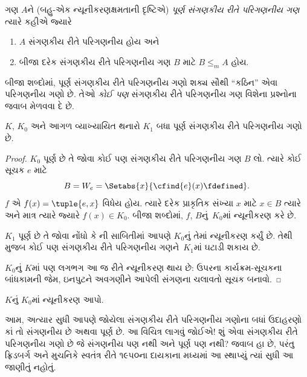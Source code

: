 \begingroup
\makeatletter{}\makeatother

\label{guunit:OLP-0245}


\begin{defn}
ગણ $A$ને (બહુ-એક ન્યૂનીકરણક્ષમતાની દૃષ્ટિએ)
\emph{પૂર્ણ સંગણકીય રીતે પરિગણનીય ગણ} ત્યારે કહીએ જ્યારે
\begin{enumerate}
\item $A$ સંગણકીય રીતે પરિગણનીય હોય અને
\item બીજા દરેક સંગણકીય રીતે પરિગણનીય ગણ $B$ માટે $B \leq_m A$ હોય.
\end{enumerate}
\end{defn}

બીજા શબ્દોમાં, પૂર્ણ સંગણકીય રીતે પરિગણનીય ગણો શક્ય
સૌથી ``કઠિન'' એવા પરિગણનીય ગણો છે. તેઓ \emph{કોઈ પણ}
સંગણકીય રીતે પરિગણનીય ગણ વિશેના પ્રશ્નોના જવાબ મેળવવા દે છે.

\begin{thm}
$K$, $K_0$ અને આગળ વ્યાખ્યાયિત થનારો $K_1$ બધા પૂર્ણ
સંગણકીય રીતે પરિગણનીય ગણો છે.
\end{thm}

\begin{proof}
$K_0$ પૂર્ણ છે તે જોવા કોઈ પણ સંગણકીય રીતે પરિગણનીય ગણ
$B$ લો. ત્યારે કોઈ સૂચક $e$ માટે
\[
B = W_e = \Setabs{x}{\cfind{e}(x) \fdefined}.
\]
$f$ એ $f(x) = \tuple{e, x}$ વિધેય હોય. ત્યારે દરેક પ્રાકૃતિક
સંખ્યા $x$ માટે $x \in B$ ત્યારે અને માત્ર ત્યારે જ્યારે
$f(x) \in K_0$. બીજા શબ્દોમાં, $f$, $B$નું~$K_0$માં
ન્યૂનીકરણ કરે છે.

$K_1$ પૂર્ણ છે તે જોવા નોંધો કે ની
સાબિતીમાં આપણે $K_0$નું તેમાં ન્યૂનીકરણ કર્યું છે. તેથી
 મુજબ કોઈ પણ સંગણકીય રીતે
પરિગણનીય ગણને~$K_1$માં ઘટાડી શકાય છે.

$K_0$નું $K$માં પણ લગભગ આ જ રીતે ન્યૂનીકરણ થાય છે:
ઉપરના કાર્યક્રમ-સૂચકના બાંધકામની જેમ, ઇનપુટને અવગણીને
આપેલી સંગણના ચલાવતો સૂચક બનાવો.
\end{proof}

\begin{prob}
$K$નું $K_0$માં ન્યૂનીકરણ આપો.
\end{prob}

\begin{digress}
આમ, અત્યાર સુધી આપણે જોયેલા સંગણકીય રીતે પરિગણનીય ગણોના
બધાં ઉદાહરણો કાં તો સંગણનીય છે અથવા પૂર્ણ છે. આ વિચિત્ર
લાગવું જોઈએ!{} શું એવા સંગણકીય રીતે પરિગણનીય ગણો છે જે
સંગણનીય પણ નથી અને પૂર્ણ પણ નથી? જવાબ હા છે, પરંતુ
ફ્રિડબર્ગ અને મુચનિકે સ્વતંત્ર રીતે ૧૯૫૦ના દાયકાના મધ્યમાં
આ સ્થાપ્યું ત્યાં સુધી આ જાણીતું નહોતું.
\end{digress}
\endgroup


